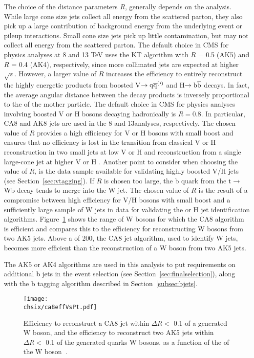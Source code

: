 The choice of the distance parameters $R$, generally depends on the analysis. While large cone size jets collect all energy from the scattered parton, they also pick up a large contribution of background energy from the underlying event or pileup interactions. Small cone size jets pick up little contamination, but may not collect all energy from the scattered parton. 
The default choice in CMS for physics analyses at 8 and 13 TeV uses the KT algorithm with $R$ = 0.5 (AK5) and $R$ = 0.4 (AK4), respectively, since more collimated jets are expected at higher $\sqrt{s}$.
However, a larger value of $R$ increases the efficiency to entirely reconstruct the highly energetic products from boosted V$\rightarrow\mathrm{q}\overline{\mathrm{q}}^({}'^){}$ and H$\rightarrow{\mathrm{b}\overline{\mathrm{b}}}$ decays. In fact, the average angular distance between the decay products is inversely proportional to the \pt of the mother particle. The default choice in CMS for physics analyses involving boosted V or H bosons decaying hadronically is $R = 0.8$. In particular, CA8 and AK8 jets are used in the 8 and 13\TeV analyses, respectively. The chosen value of $R$ provides a high efficiency for V or H bosons with small boost and ensures that no efficiency is lost in the transition from classical V or H reconstruction in two small jets at low V or H \pt and reconstruction from a single large-cone jet at higher V or H \pt. Another point to consider when choosing the value of $R$, is the \ttbar data sample available for validating highly boosted V/H jets (see Section~\ref{sec:vtagging}). If $R$ is chosen too large, the b quark from the t$\rightarrow$Wb decay tends to merge into the W jet. The chosen value of $R$ is the result of a compromise between high efficiency for V/H bosons with small boost and a sufficiently large sample of W jets in \ttbar data for validating the  or H jet identification algorithms. Figure~\ref{fig:ca8effVsPt} shows the \pt range of W bosons for which the CA8 algorithm is efficient and compares this to the efficiency for reconstructing W bosons from two AK5 jets. Above a \pt of 200\GeV, the CA8 jet algorithm, used to identify W jets, becomes more efficient than the reconstruction of a W boson from two AK5 jets.

The AK5 or AK4 algorithms are used in this analysis to put requirements on additional b jets in the event selection (see Section~\ref{sec:finalselection}), along with the b tagging algorithm described in Section~\ref{subsec:bjets}.

\begin{figure}[!htb]
 \begin{center}
  \texttt{[image: \\chsix/ca8effVsPt.pdf]}
 \end{center}
 \caption{Efficiency to reconstruct a CA8 jet within $\Delta R <$ 0.1 of a generated W boson, and the efficiency to reconstruct two AK5 jets within $\Delta R <$ 0.1 of the generated quarks W bosons, as a function of the \pt of the W boson~\cite{Khachatryan:2014vla}.}
 \label{fig:ca8effVsPt}
\end{figure}

